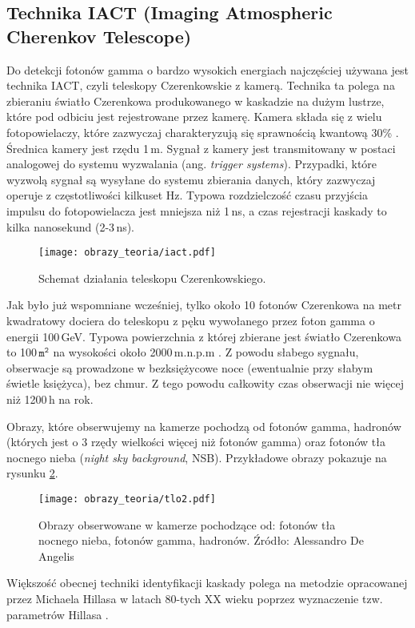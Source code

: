 \documentclass[a4paper,11pt,twoside]{article}
\begin{document}
\subsection{Technika IACT (Imaging Atmospheric Cherenkov Telescope)}
Do detekcji fotonów gamma o bardzo wysokich energiach najczęściej używana jest technika IACT, czyli teleskopy Czerenkowskie z kamerą. Technika ta polega na zbieraniu światło Czerenkowa produkowanego w kaskadzie na dużym lustrze, które pod odbiciu jest rejestrowane przez kamerę. Kamera składa się z wielu fotopowielaczy, które zazwyczaj charakteryzują się sprawnością kwantową 30\% \cite{particle_de_angelis}. Średnica kamery jest rzędu 1\,m. Sygnał z kamery jest transmitowany w postaci analogowej do systemu wyzwalania (ang. \textsl{trigger systems}). Przypadki, które wyzwolą sygnał są wysyłane do systemu zbierania danych, który zazwyczaj operuje z częstotliwości kilkuset Hz. Typowa rozdzielczość czasu przyjścia impulsu do fotopowielacza jest mniejsza niż 1\,ns, a czas rejestracji kaskady to kilka nanosekund (2-3\,ns).
\begin{figure}[H] 
\centering
\texttt{[image: obrazy\_teoria/iact.pdf]}
\caption{Schemat działania teleskopu Czerenkowskiego.}
\label{fig:kamera}
\end{figure}
Jak było już wspomniane wcześniej, tylko około 10 fotonów Czerenkowa na metr kwadratowy dociera do teleskopu z pęku wywołanego przez foton gamma o energii 100\,GeV. Typowa powierzchnia z której zbierane jest światło Czerenkowa to 100\,$\mathtt{m^2}$ na wysokości około 2000\,m.n.p.m \cite{particle_de_angelis}. Z powodu słabego sygnału, obserwacje są prowadzone w bezksiężycowe noce (ewentualnie przy słabym świetle księżyca), bez chmur. Z tego powodu całkowity czas obserwacji nie więcej niż 1200\,h na rok.

Obrazy, które obserwujemy na kamerze pochodzą od fotonów gamma, hadronów (których jest o 3 rzędy wielkości więcej niż fotonów gamma) oraz fotonów tła nocnego nieba (\textsl{night sky background}, NSB). Przykładowe obrazy pokazuje na rysunku
 \ref{fig:kamera}.
\begin{figure}[H] 
\centering
\texttt{[image: obrazy\_teoria/tlo2.pdf]}
\caption{Obrazy obserwowane w kamerze pochodzące od: fotonów tła nocnego nieba, fotonów gamma, hadronów. Źródło: Alessandro	De	Angelis}
\label{fig:kamera}
\end{figure}
Większość obecnej techniki identyfikacji kaskady polega na metodzie opracowanej przez Michaela Hillasa w latach 80-tych XX wieku poprzez wyznaczenie tzw. parametrów Hillasa \cite{hilas}.
\end{document}
